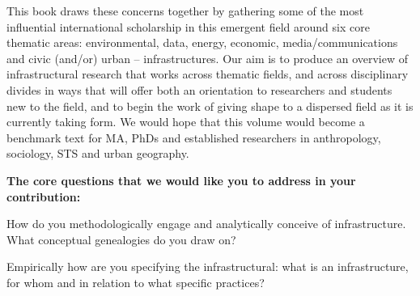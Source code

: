 \documentclass[a4,portrait,11pt]{article}
\begin{document}
\begin{flushleft}

\end{flushleft}


\begin{flushleft}
This book draws these concerns together by gathering some of the most influential international scholarship in this emergent field around six core thematic areas: environmental, data, energy, economic, media/communications and civic (and/or) urban -- infrastructures. Our aim is to produce an overview of infrastructural research that works across thematic fields, and across disciplinary divides in ways that will offer both an orientation to researchers and students new to the field, and to begin the work of giving shape to a dispersed field as it is currently taking form. We would hope that this volume would become a benchmark text for MA, PhDs and established researchers in anthropology, sociology, STS and urban geography. 
\end{flushleft}


\begin{flushleft}
\textbf{\newpage
The core questions that we would like you to address in your contribution:}
\end{flushleft}


\begin{flushleft}

\end{flushleft}


\begin{flushleft}

\end{flushleft}


\begin{flushleft}
How do you methodologically engage and analytically conceive of infrastructure. What conceptual genealogies do you draw on?
\end{flushleft}


\begin{flushleft}

\end{flushleft}


\begin{flushleft}
Empirically how are you specifying the infrastructural: what is an infrastructure, for whom and in relation to what specific practices?   
\end{flushleft}


\begin{flushleft}

\end{flushleft}
\end{document}
